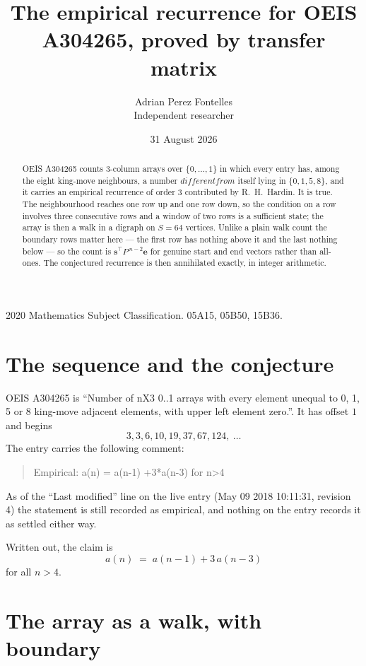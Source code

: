 \documentclass[11pt,a4paper]{article}
\title{The empirical recurrence for OEIS A304265, proved by transfer matrix}
\author{Adrian Perez Fontelles\\ \small Independent researcher}
\date{31 August 2026}
\theoremstyle{plain}
\theoremstyle{definition}
\begin{document}
\maketitle

\begin{abstract}
OEIS A304265 counts $3$-column arrays over $\{0,\dots,1\}$ in which every entry has,
among the eight king-move neighbours, a number $different from$ itself lying in $\{0,1,5,8\}$, and it carries an empirical
recurrence of order $3$ contributed by R.~H.~Hardin. It is true. The neighbourhood
reaches one row up and one row down, so the condition on a row involves three consecutive
rows and a window of two rows is a sufficient state; the array is then a walk in a digraph
on $S=64$ vertices. Unlike a plain walk count the boundary rows matter here --- the first
row has nothing above it and the last nothing below --- so the count is
$\mathbf{s}^{\!\top}P^{\,n-2}\mathbf{e}$ for genuine start and end vectors rather than
all-ones. The conjectured recurrence is then annihilated exactly, in integer arithmetic.
\end{abstract}

\noindent\small 2020 Mathematics Subject Classification. 05A15, 05B50, 15B36.\normalsize

\section{The sequence and the conjecture}

OEIS A304265 is ``Number of nX3 0..1 arrays with every element unequal to 0, 1, 5 or 8 king-move adjacent elements, with upper left element zero.''. It has offset
$1$ and begins
\[
3, 3, 6, 10, 19, 37, 67, 124,\ \dots
\]
The entry carries the following comment:
\begin{quote}\small
Empirical: a(n) = a(n-1) +3*a(n-3) for n>4
\end{quote}
As of the ``Last modified'' line on the live entry (May 09 2018 10:11:31, revision
4) the statement is still recorded as empirical, and nothing on the entry
records it as settled either way.

Written out, the claim is
\begin{equation}\label{eq:conj}
a(n)\;=\;a(n-1) + 3\,a(n-3)
\end{equation}
for all $n>4$.

\section{The array as a walk, with boundary}
\end{document}
